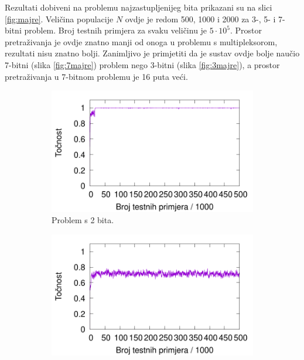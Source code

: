 \documentclass[times, utf8, zavrsni]{fer}
\begin{document}
Rezultati dobiveni na problemu najzastupljenijeg bita prikazani su na slici \ref{fig:majre}.
Veličina populacije $N$ ovdje je redom 500, 1000 i 2000 za 3-, 5- i 7-bitni problem.
Broj testnih primjera za svaku veličinu je $5 \cdot 10^{5}$.
Prostor pretraživanja je ovdje znatno manji od onoga u problemu s multipleksorom, rezultati nisu znatno bolji.
Zanimljivo je primjetiti da je sustav ovdje bolje naučio 7-bitni (slika \ref{fig:7majre}) problem nego 3-bitni (slika \ref{fig:3majre}), a prostor pretraživanja u 7-bitnom problemu je 16 puta veći.

\begin{figure}[!h]
    \centering
    \begin{subfigure}{0.496\textwidth}
        \centering
        \includegraphics[width=\textwidth]{img/parity/2pare.pdf}
        \caption{Problem s 2 bita.}
        \label{fig:2pare}
    \end{subfigure}
    \begin{subfigure}{0.496\textwidth}
        \centering
        \includegraphics[width=\textwidth]{img/parity/3pare.pdf}

\end{subfigure}
\end{figure}
\end{document}
